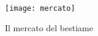  \begin{figure}[htb]
    \centering
    \texttt{[image: mercato]}
    \caption*{Il mercato del bestiame\label{fig:mercato}}
\end{figure}











%
